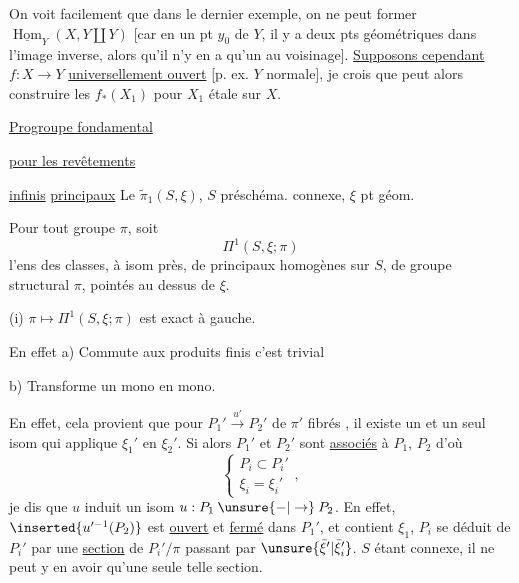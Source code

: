 On voit facilement que dans le dernier exemple, on ne peut former $\underline{\operatorname{Hom}}_Y(X,Y\amalg Y)$
[car en un  pt $y_0$ de $Y$, il y a deux pts géométriques dans l'image inverse, alors qu'il n'y en a qu'un au voisinage].
\uline{Supposons cependant} $f:X\to Y$ \uline{universellement ouvert} [p. ex. $Y$ normale], je crois que
peut alors  construire les $f_*(X_1)$ pour $X_1$ étale sur $X$.


\uline{Progroupe fondamental}

\uline{pour les revêtements}

\uline{infinis} \uline{principaux}
Le $\widetilde{\pi}_1(S,\xi)$, $S$ préschéma. connexe, $\xi$ pt géom.

Pour tout groupe $\pi$, soit
\[
\Pi^1(S,\xi;\pi)
\]
l'ens des classes, à isom près, de  principaux homogènes sur $S$, de groupe structural $\pi$, pointés au dessus de $\xi$.

(i) $\pi\mapsto\Pi^1(S,\xi;\pi)$ est exact à gauche.

En effet a) Commute aux produits finis c'est trivial

b) Transforme un mono  en mono.

En effet, cela provient que pour   
$P_1'\overset{u'}{\longrightarrow}P_2'$ de  $\pi'$ fibrés , il existe un et un seul  isom qui applique $\xi_1'$ en $\xi_2'$.
Si alors $P_1'$ et $P_2'$ sont \uline{associés} à $P_1$, $P_2$ d'où
\[
\left\{\begin{array}{l}
P_i\subset P_i'\\
\xi_i=\xi_i'
\end{array}\right.,
\]
 je dis que $u$   induit un isom $u:P_1\mathbin{\unsure{-|\to}}P_2$.
En effet, 
$\inserted{u'^{-1}(P_2)}$ est \uline{ouvert} et \uline{fermé} dans $P_1'$, et contient $\xi_1$, 
 $P_i$ se déduit de $P_i'$ par une \uline{section} de $P_i'/\pi$ passant par $\unsure{\bar\xi'|\bar\xi_i'}$. $S$ étant connexe, il ne peut y en avoir qu'une seule telle section.

